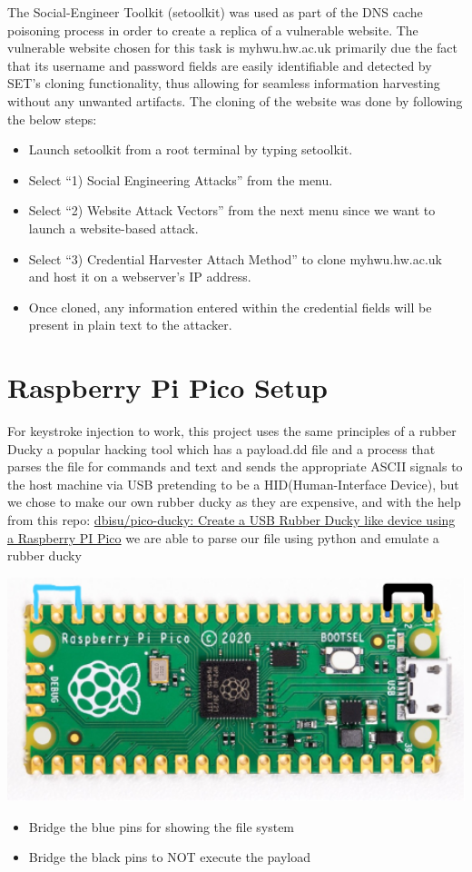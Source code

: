 \documentclass[11pt]{report}
\begin{document}
The Social-Engineer Toolkit (setoolkit) was used as part of the DNS cache
poisoning process in order to create a replica of a vulnerable website. The
vulnerable website chosen for this task is myhwu.hw.ac.uk primarily due the
fact that its username and password fields are easily identifiable and detected
by SET's cloning functionality, thus allowing for seamless information
harvesting without any unwanted artifacts. The cloning of the website was done
by following the below steps:
\begin{itemize}
  \item Launch setoolkit from a root terminal by typing setoolkit.
  \item Select “1) Social Engineering Attacks” from the menu.
  \item Select “2) Website Attack Vectors” from the next menu since we want to launch a website-based attack.
  \item Select “3) Credential Harvester Attach Method” to clone myhwu.hw.ac.uk and host it on a webserver's IP address.
  \item Once cloned, any information entered within the credential fields will be present in plain text to the attacker.
  
\end{itemize}


\section*{Raspberry Pi Pico Setup} 

For keystroke injection to work, this project uses the same principles of a
rubber Ducky a popular hacking tool which has a payload.dd file and a process
that parses the file for commands and text and sends the appropriate ASCII
signals to the host machine via USB pretending to be a HID(Human-Interface
Device), but we chose to make our own rubber ducky as they are expensive, and
with the help from this repo: \href{https://github.com/dbisu/pico-ducky}{dbisu/pico-ducky: Create a USB Rubber Ducky like
device using a Raspberry PI Pico} we are able to parse our file
using python and emulate a rubber ducky

\includegraphics[origin=c,width=15cm]{Figures/pico.png}
\begin{itemize}
  \item Bridge the blue pins for showing the file system
  \item Bridge the black pins to NOT execute the payload
\end{itemize}
\end{document}
